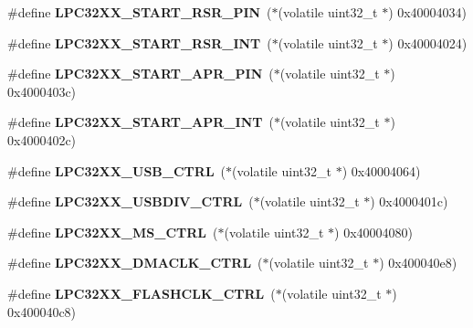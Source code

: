 \begin{DoxyCompactItemize}
\#define {\bfseries L\+P\+C32\+X\+X\+\_\+\+S\+T\+A\+R\+T\+\_\+\+R\+S\+R\+\_\+\+P\+IN}~($\ast$(volatile uint32\+\_\+t $\ast$) 0x40004034)
\item 
\mbox{\label{group__lpc32xx__reg_gaa16e8edc56db3c6cb8a88e4363d297d7}} 
\#define {\bfseries L\+P\+C32\+X\+X\+\_\+\+S\+T\+A\+R\+T\+\_\+\+R\+S\+R\+\_\+\+I\+NT}~($\ast$(volatile uint32\+\_\+t $\ast$) 0x40004024)
\item 
\mbox{\label{group__lpc32xx__reg_ga04e596346ae0cb2e821bff6184d32f4d}} 
\#define {\bfseries L\+P\+C32\+X\+X\+\_\+\+S\+T\+A\+R\+T\+\_\+\+A\+P\+R\+\_\+\+P\+IN}~($\ast$(volatile uint32\+\_\+t $\ast$) 0x4000403c)
\item 
\mbox{\label{group__lpc32xx__reg_ga5d93be153605c4d7b1f5b97c8636a640}} 
\#define {\bfseries L\+P\+C32\+X\+X\+\_\+\+S\+T\+A\+R\+T\+\_\+\+A\+P\+R\+\_\+\+I\+NT}~($\ast$(volatile uint32\+\_\+t $\ast$) 0x4000402c)
\item 
\mbox{\label{group__lpc32xx__reg_ga7ba403d6a71f034710fe06cd6157ef29}} 
\#define {\bfseries L\+P\+C32\+X\+X\+\_\+\+U\+S\+B\+\_\+\+C\+T\+RL}~($\ast$(volatile uint32\+\_\+t $\ast$) 0x40004064)
\item 
\mbox{\label{group__lpc32xx__reg_ga4483b4e65c543aaeb7fe07f8d59f46b1}} 
\#define {\bfseries L\+P\+C32\+X\+X\+\_\+\+U\+S\+B\+D\+I\+V\+\_\+\+C\+T\+RL}~($\ast$(volatile uint32\+\_\+t $\ast$) 0x4000401c)
\item 
\mbox{\label{group__lpc32xx__reg_ga39938c5e90ed71503fc6bb03675850fc}} 
\#define {\bfseries L\+P\+C32\+X\+X\+\_\+\+M\+S\+\_\+\+C\+T\+RL}~($\ast$(volatile uint32\+\_\+t $\ast$) 0x40004080)
\item 
\mbox{\label{group__lpc32xx__reg_ga7dd09ea70b28aea30523e3fd5056c69e}} 
\#define {\bfseries L\+P\+C32\+X\+X\+\_\+\+D\+M\+A\+C\+L\+K\+\_\+\+C\+T\+RL}~($\ast$(volatile uint32\+\_\+t $\ast$) 0x400040e8)
\item 
\mbox{\label{group__lpc32xx__reg_ga72ce8eb1ddd14d531f68afaa4bfc17b3}} 
\#define {\bfseries L\+P\+C32\+X\+X\+\_\+\+F\+L\+A\+S\+H\+C\+L\+K\+\_\+\+C\+T\+RL}~($\ast$(volatile uint32\+\_\+t $\ast$) 0x400040c8)

\end{DoxyCompactItemize}
